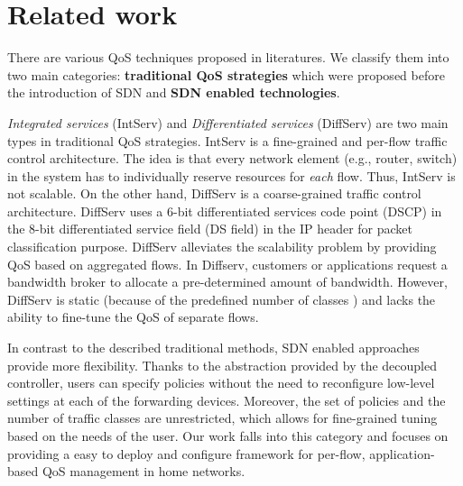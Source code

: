 \section{Related work}
\label{sect:related}

There are various QoS techniques  proposed in literatures. We classify them into two main
categories: \textbf{traditional QoS strategies} which were proposed before the introduction of SDN and
\textbf{SDN enabled technologies}.

\emph{Integrated services} (IntServ) and \emph{Differentiated services} (DiffServ)
are two main types in traditional QoS strategies. IntServ is a fine-grained and per-flow traffic control architecture.
The idea is that every network element (e.g., router, switch) in the system has to individually reserve resources for
\emph{each} flow. Thus, IntServ is not scalable. On the other hand, DiffServ is a coarse-grained traffic control
architecture. DiffServ uses a 6-bit differentiated services code point (DSCP) in the 8-bit differentiated service field
(DS field) in the IP header for packet classification purpose. DiffServ alleviates the scalability problem by providing
QoS based on aggregated flows.  In Diffserv, customers or applications request a bandwidth broker to allocate a pre-determined
amount of bandwidth. However, DiffServ is static (because of the predefined number of classes ) and lacks the ability to
fine-tune the QoS of separate flows.

In contrast to the described traditional methods, SDN enabled approaches provide more flexibility. Thanks to the abstraction
provided by the decoupled controller, users can specify policies without the need to reconfigure low-level settings at each
of the forwarding devices. Moreover, the set of policies and the number of traffic classes are unrestricted, which allows for
fine-grained tuning based on the needs of the user. Our work falls into this category and focuses on providing a easy to deploy
and configure framework for per-flow, application-based QoS management in home networks.

